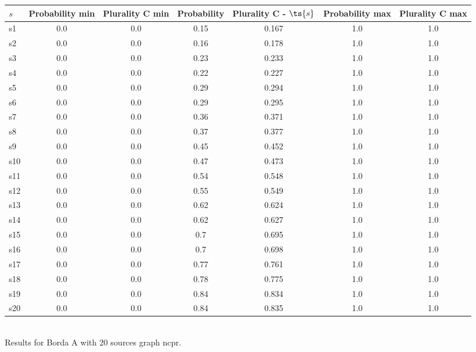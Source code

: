 \documentclass{article}
\begin{document}
\noindent\begin{tabular}{|l|c|c|c|c|c|c|}
\hline
$s$& Probability min & Plurality C min & Probability & Plurality C - $\ts{s}$ & Probability max & Plurality C max\\
\hline
s1 &0.0 & 0.0 & 0.15 & 0.167 & 1.0 & 1.0\\
\hline
s2 &0.0 & 0.0 & 0.16 & 0.178 & 1.0 & 1.0\\
\hline
s3 &0.0 & 0.0 & 0.23 & 0.233 & 1.0 & 1.0\\
\hline
s4 &0.0 & 0.0 & 0.22 & 0.227 & 1.0 & 1.0\\
\hline
s5 &0.0 & 0.0 & 0.29 & 0.294 & 1.0 & 1.0\\
\hline
s6 &0.0 & 0.0 & 0.29 & 0.295 & 1.0 & 1.0\\
\hline
s7 &0.0 & 0.0 & 0.36 & 0.371 & 1.0 & 1.0\\
\hline
s8 &0.0 & 0.0 & 0.37 & 0.377 & 1.0 & 1.0\\
\hline
s9 &0.0 & 0.0 & 0.45 & 0.452 & 1.0 & 1.0\\
\hline
s10 &0.0 & 0.0 & 0.47 & 0.473 & 1.0 & 1.0\\
\hline
s11 &0.0 & 0.0 & 0.54 & 0.548 & 1.0 & 1.0\\
\hline
s12 &0.0 & 0.0 & 0.55 & 0.549 & 1.0 & 1.0\\
\hline
s13 &0.0 & 0.0 & 0.62 & 0.624 & 1.0 & 1.0\\
\hline
s14 &0.0 & 0.0 & 0.62 & 0.627 & 1.0 & 1.0\\
\hline
s15 &0.0 & 0.0 & 0.7 & 0.695 & 1.0 & 1.0\\
\hline
s16 &0.0 & 0.0 & 0.7 & 0.698 & 1.0 & 1.0\\
\hline
s17 &0.0 & 0.0 & 0.77 & 0.761 & 1.0 & 1.0\\
\hline
s18 &0.0 & 0.0 & 0.78 & 0.775 & 1.0 & 1.0\\
\hline
s19 &0.0 & 0.0 & 0.84 & 0.834 & 1.0 & 1.0\\
\hline
s20 &0.0 & 0.0 & 0.84 & 0.835 & 1.0 & 1.0\\
\hline
\end{tabular}\\

\noindent Results for Borda A with 20 sources graph ncpr.
\end{document}

